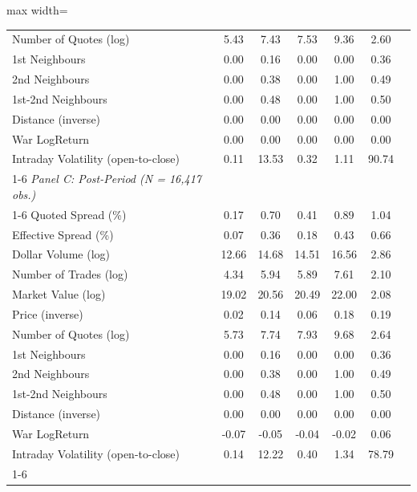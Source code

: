 \begin{table}[!htp]
\begin{adjustbox}{max width=\textwidth}
\begin{tabular}{lcccccc}
Number of Quotes (log) & 5.43 & 7.43 & 7.53 & 9.36 & 2.60 &  \\
1st Neighbours & 0.00 & 0.16 & 0.00 & 0.00 & 0.36 &  \\
2nd Neighbours & 0.00 & 0.38 & 0.00 & 1.00 & 0.49 &  \\
1st-2nd Neighbours & 0.00 & 0.48 & 0.00 & 1.00 & 0.50 &  \\
Distance (inverse) & 0.00 & 0.00 & 0.00 & 0.00 & 0.00 &  \\
War LogReturn & 0.00 & 0.00 & 0.00 & 0.00 & 0.00 &  \\
Intraday Volatility (open-to-close) & 0.11 & 13.53 & 0.32 & 1.11 & 90.74 &  \\
\cmidrule{1-6}
\textit{Panel C: Post-Period (N = 16,417 obs.)} \\
\cmidrule{1-6}
Quoted Spread (\%) & 0.17 & 0.70 & 0.41 & 0.89 & 1.04 &  \\
Effective Spread (\%) & 0.07 & 0.36 & 0.18 & 0.43 & 0.66 &  \\
Dollar Volume (log) & 12.66 & 14.68 & 14.51 & 16.56 & 2.86 &  \\
Number of Trades (log) & 4.34 & 5.94 & 5.89 & 7.61 & 2.10 &  \\
Market Value (log) & 19.02 & 20.56 & 20.49 & 22.00 & 2.08 &  \\
Price (inverse) & 0.02 & 0.14 & 0.06 & 0.18 & 0.19 &  \\
Number of Quotes (log) & 5.73 & 7.74 & 7.93 & 9.68 & 2.64 &  \\
1st Neighbours & 0.00 & 0.16 & 0.00 & 0.00 & 0.36 &  \\
2nd Neighbours & 0.00 & 0.38 & 0.00 & 1.00 & 0.49 &  \\
1st-2nd Neighbours & 0.00 & 0.48 & 0.00 & 1.00 & 0.50 &  \\
Distance (inverse) & 0.00 & 0.00 & 0.00 & 0.00 & 0.00 &  \\
War LogReturn & -0.07 & -0.05 & -0.04 & -0.02 & 0.06 &  \\
Intraday Volatility (open-to-close) & 0.14 & 12.22 & 0.40 & 1.34 & 78.79 &  \\
\cmidrule{1-6}
\end{tabular}
 \end{adjustbox}
 \end{table}
